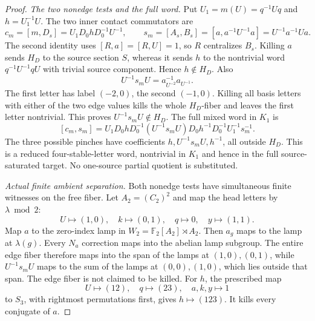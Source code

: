 \begin{proof}
\emph{The two nonedge tests and the full word.}
Put \(U_1=m(U)=q^{-1}Uq\) and \(h=U_1^{-1}U\). The two inner
contact commutators are
\[
 c_m=[m,D_s]=U_1D_0hD_0^{-1}U^{-1},\qquad
 s_m=[A_s,B_s]=[a,a^{-1}U^{-1}a]=U^{-1}a^{-1}Ua.
\]
The second identity uses \([R,a]=[R,U]=1\), so \(R\) centralizes
\(B_s\). Killing \(a\) sends \(H_D\) to the source section \(S\),
whereas it sends \(h\) to the nontrivial word
\(q^{-1}U^{-1}qU\) with trivial source component. Hence \(h\notin H_D\).
Also
\[
                       U^{-1}s_mU=a_{U^{-2}}^{-1}a_{U^{-1}}.
\]
The first letter has label \((-2,0)\), the second \((-1,0)\).
Killing all basis letters with either of the two edge values kills the
whole \(H_D\)-fiber and leaves the first letter nontrivial. This proves
\(U^{-1}s_mU\notin H_D\).
The full mixed word in \(K_1\) is
\begin{equation}\label{eq:B178-Britton}
 [c_m,s_m]
 =U_1D_0hD_0^{-1}(U^{-1}s_mU)
       D_0h^{-1}D_0^{-1}U_1^{-1}s_m^{-1}.
\end{equation}
The three possible pinches have coefficients
\(h,U^{-1}s_mU,h^{-1}\), all outside \(H_D\). This is a reduced
four-stable-letter word, nontrivial in \(K_1\) and hence in the full
source-saturated target. No one-source partial quotient is substituted.

\emph{Actual finite ambient separation.}
Both nonedge tests have simultaneous finite witnesses on the free fiber.
Let \(A_2=(C_2)^2\) and map the head letters by \(\lambda\bmod2\):
\[
 U\mapsto(1,0),\quad k\mapsto(0,1),\quad q\mapsto0,
                         \quad y\mapsto(1,1).
\]
Map \(a\) to the zero-index lamp in
\(W_2=\mathbb F_2[A_2]\rtimes A_2\).
Then \(a_g\) maps to the lamp at \(\lambda(g)\). Every \(N_a\)
correction maps into the abelian lamp subgroup. The entire edge fiber
therefore maps into the span of the lamps at \((1,0),(0,1)\), while
\(U^{-1}s_mU\) maps to the sum of the lamps at \((0,0),(1,0)\),
which lies outside that span. The edge fiber is not claimed to be killed.
For \(h\), the prescribed map
\[
            U\mapsto(12),\quad q\mapsto(23),\quad a,k,y\mapsto1
\]
to \(S_3\), with rightmost permutations first, gives \(h\mapsto(123)\).
It kills every conjugate of \(a\).


\end{proof}

